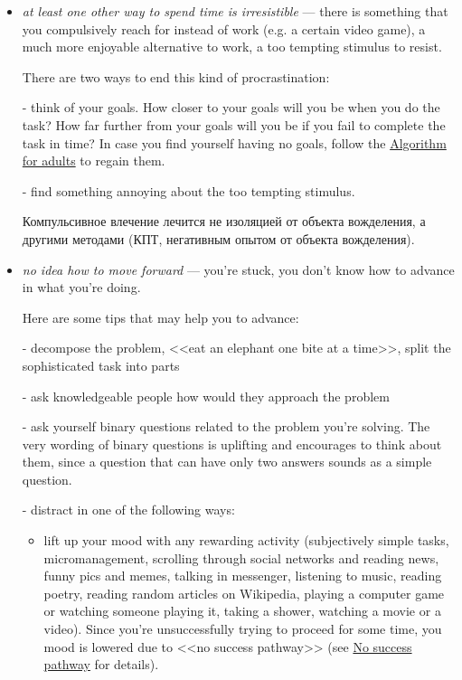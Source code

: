 \documentclass[11pt]{article}
\theoremstyle{remark}
\theoremstyle{definition}
\begin{document}
\begin{itemize}
\item \textit{at least one other way to spend time is irresistible} --- there is something that you compulsively reach for instead of work (e.g. a certain video game), a much more enjoyable alternative to work, a too tempting stimulus to resist.

There are two ways to end this kind of procrastination: 

- think of your goals. How closer to your goals will you be when you do the task? How far further from your goals will you be if you fail to complete the task in time? In case you find yourself having no goals, follow the \href{https://garkoosha.org/misc/alg_for_adults.pdf}{Algorithm for adults} to regain them.

- find something annoying about the too tempting stimulus.


Компульсивное влечение лечится не изоляцией от объекта вожделения, а другими методами (КПТ, негативным опытом от объекта вожделения). 









 
\item \textit{no idea how to move forward} --- you're stuck, you don't know how to advance in what you're doing.


Here are some tips that may help you to advance:

- decompose the problem, <<eat an elephant one bite at a time>>, split the sophisticated task into parts

- ask knowledgeable people how would they approach the problem

- ask yourself binary questions related to the problem you're solving. The very wording of binary questions is uplifting and encourages to think about them, since a question that can have only two answers sounds as a simple question.

- distract in one of the following ways:

\begin{itemize}

\item lift up your mood with any rewarding activity (subjectively simple tasks, micromanagement, scrolling through social networks and reading news, funny pics and memes, talking in messenger, listening to music, reading poetry, reading random articles on Wikipedia, playing a computer game or watching someone playing it, taking a shower, watching a movie or a video). Since you're unsuccessfully trying to proceed for some time, you mood is lowered due to <<no success pathway>> (see \href{https://garkoosha.org/misc/nsp.pdf}{No success pathway} for details). 


\end{itemize}
\end{itemize}
\end{document}
